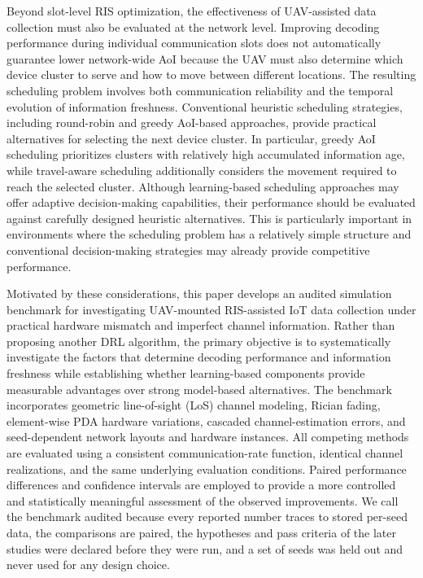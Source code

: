 \documentclass[journal]{IEEEtran}
\begin{document}
Beyond slot-level RIS optimization, the effectiveness of UAV-assisted data collection must also be evaluated at the network level. Improving decoding performance during individual communication slots does not automatically guarantee lower network-wide AoI because the UAV must also determine which device cluster to serve and how to move between different locations. The resulting scheduling problem involves both communication reliability and the temporal evolution of information freshness. Conventional heuristic scheduling strategies, including round-robin and greedy AoI-based approaches, provide practical alternatives for selecting the next device cluster. In particular, greedy AoI scheduling prioritizes clusters with relatively high accumulated information age, while travel-aware scheduling additionally considers the movement required to reach the selected cluster. Although learning-based scheduling approaches may offer adaptive decision-making capabilities, their performance should be evaluated against carefully designed heuristic alternatives. This is particularly important in environments where the scheduling problem has a relatively simple structure and conventional decision-making strategies may already provide competitive performance.

Motivated by these considerations, this paper develops an audited simulation benchmark for investigating UAV-mounted RIS-assisted IoT data collection under practical hardware mismatch and imperfect channel information. Rather than proposing another DRL algorithm, the primary objective is to systematically investigate the factors that determine decoding performance and information freshness while establishing whether learning-based components provide measurable advantages over strong model-based alternatives. The benchmark incorporates geometric line-of-sight (LoS) channel modeling, Rician fading, element-wise PDA hardware variations, cascaded channel-estimation errors, and seed-dependent network layouts and hardware instances. All competing methods are evaluated using a consistent communication-rate function, identical channel realizations, and the same underlying evaluation conditions. Paired performance differences and confidence intervals are employed to provide a more controlled and statistically meaningful assessment of the observed improvements. We call the benchmark audited because every reported number traces to stored per-seed data, the comparisons are paired, the hypotheses and pass criteria of the later studies were declared before they were run, and a set of seeds was held out and never used for any design choice.
\end{document}
